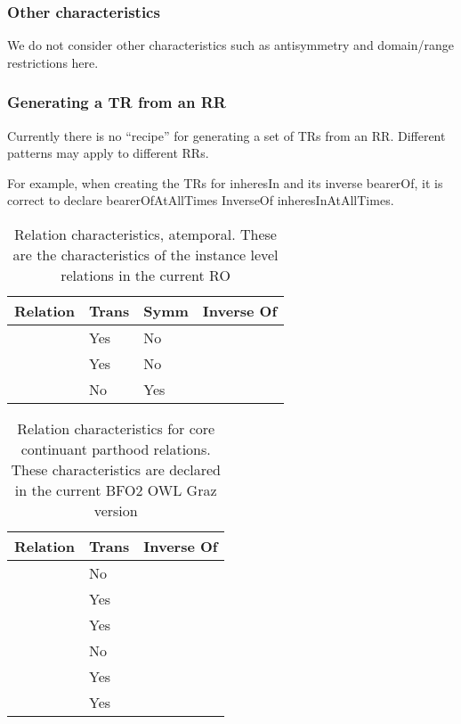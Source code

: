 \documentclass{bioinfo}
\def\partOf{\pr{part\_of}}
\def\hasPart{\pr{has\_part}}
\def\adjacentTo{\pr{adjacent\_to}}
\def\hasPartAtAllTimesForWhichPartExists{\pr{has-part-} \pr{at-all-times-}\ \pr{for-which-part-exists}}
\def\partOfAtAllTimesForWhichWholeExists{\pr{part-of-} \pr{at-all-times-}\ \pr{for-which-whole-exists}}
\def\atAllTimes{\pr{at-all-times}}
\def\atSomeTimes{\pr{at-some-times}}
\begin{document}
\subsubsection{Other characteristics}

We do not consider other characteristics such as antisymmetry and
domain/range restrictions here.


\subsubsection{Generating a TR from an RR}

Currently there is no ``recipe'' for generating a set of TRs from an
RR. Different patterns may apply to different RRs.

For example, when creating the TRs for inheresIn and its inverse
bearerOf, it is correct to declare bearerOfAtAllTimes InverseOf
inheresInAtAllTimes.


\begin{table}
\begin{tabular}{ | p{3cm} | p{1cm} | p{1cm} | p{3cm} | }
\hline
\textbf{Relation} & \textbf{Trans} & \textbf{Symm} & \textbf{Inverse Of}  \\
\hline
\partOf\  & Yes & No & \hasPart  \\
\hline
\hasPart\ & Yes & No & \partOf \\
\hline
\adjacentTo\ & No & Yes &  \\
\hline
\end{tabular}
\caption{Relation characteristics, atemporal. These are the characteristics of the instance level relations in the current RO}
\label{tab:characteristics-atemporal}
\end{table}


\begin{table}
\begin{tabular}{ | p{3cm} | p{1cm} | p{4cm} | }
\hline
\textbf{Relation} & \textbf{Trans} & \textbf{Inverse Of}  \\
\hline
\partOf\ \atSomeTimes & No & \hasPart\ \atSomeTimes \\
\hline
\partOf\ \atAllTimes & Yes & \hasPartAtAllTimesForWhichPartExists \\
\hline
\partOfAtAllTimesForWhichWholeExists & Yes & \hasPart\ \atAllTimes \\
\hline
\hasPart\ \atSomeTimes & No & \partOf\ \atSomeTimes \\
\hline
\hasPart\ \atAllTimes & Yes & \partOfAtAllTimesForWhichWholeExists \\
\hline
\hasPartAtAllTimesForWhichPartExists & Yes & \partOf\ \atAllTimes \\
\hline
\end{tabular}
\caption{Relation characteristics for core continuant parthood relations. These characteristics are declared in the current BFO2 OWL Graz version}
\label{tab:characteristics-temporalized}
\end{table}
\end{document}
